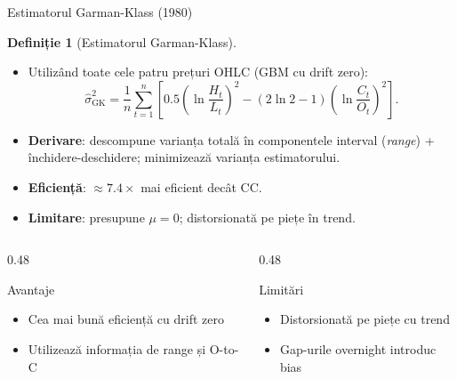\documentclass[9pt, aspectratio=169, t]{beamer}
\theoremstyle{definition}
\newtheorem{defn}{Definiție}
\begin{document}
\begin{frame}{Estimatorul Garman-Klass (1980)}
\begin{defn}[Estimatorul Garman-Klass]
\begin{itemize}\setlength{\itemsep}{1pt}
    \item Utilizând toate cele patru prețuri OHLC (GBM cu drift zero):
    {\small
    \[
    \hat{\sigma}_{\text{GK}}^2 = \frac{1}{n}\sum_{t=1}^{n}\!\left[0.5\!\left(\ln\frac{H_t}{L_t}\right)^{\!2} - (2\ln 2 - 1)\!\left(\ln\frac{C_t}{O_t}\right)^{\!2}\right].
    \]
    }
\end{itemize}
\end{defn}
\begin{itemize}
    \item \textbf{Derivare}: descompune varianța totală în componentele interval (\textit{range}) + închidere-deschidere; minimizează varianța estimatorului.
    \item \textbf{Eficiență}: $\approx 7.4\times$ mai eficient decât CC.
    \item \textbf{Limitare}: presupune $\mu=0$; distorsionată pe piețe în trend.
\end{itemize}
\begin{columns}[T]
\begin{column}{0.48\textwidth}
\begin{block}{Avantaje}
\begin{itemize}\setlength{\itemsep}{0pt}
    \item Cea mai bună eficiență cu drift zero
    \item Utilizează informația de range și O-to-C
\end{itemize}
\end{block}
\end{column}
\begin{column}{0.48\textwidth}
\begin{block}{Limitări}
\begin{itemize}\setlength{\itemsep}{0pt}
    \item Distorsionată pe piețe cu trend
    \item Gap-urile overnight introduc bias
\end{itemize}
\end{block}
\end{column}
\end{columns}
\end{frame}
\end{document}
